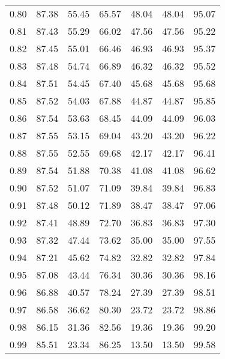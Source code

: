 \begin{tabular}{|c|c|c|c|c|c|c|}
      0.80 &     87.38 &     55.45 &      65.57 &   48.04 &      48.04 &         95.07 \\
      0.81 &     87.43 &     55.29 &      66.02 &   47.56 &      47.56 &         95.22 \\
      0.82 &     87.45 &     55.01 &      66.46 &   46.93 &      46.93 &         95.37 \\
      0.83 &     87.48 &     54.74 &      66.89 &   46.32 &      46.32 &         95.52 \\
      0.84 &     87.51 &     54.45 &      67.40 &   45.68 &      45.68 &         95.68 \\
      0.85 &     87.52 &     54.03 &      67.88 &   44.87 &      44.87 &         95.85 \\
      0.86 &     87.54 &     53.63 &      68.45 &   44.09 &      44.09 &         96.03 \\
      0.87 &     87.55 &     53.15 &      69.04 &   43.20 &      43.20 &         96.22 \\
      0.88 &     87.55 &     52.55 &      69.68 &   42.17 &      42.17 &         96.41 \\
      0.89 &     87.54 &     51.88 &      70.38 &   41.08 &      41.08 &         96.62 \\
      0.90 &     87.52 &     51.07 &      71.09 &   39.84 &      39.84 &         96.83 \\
      0.91 &     87.48 &     50.12 &      71.89 &   38.47 &      38.47 &         97.06 \\
      0.92 &     87.41 &     48.89 &      72.70 &   36.83 &      36.83 &         97.30 \\
      0.93 &     87.32 &     47.44 &      73.62 &   35.00 &      35.00 &         97.55 \\
      0.94 &     87.21 &     45.62 &      74.82 &   32.82 &      32.82 &         97.84 \\
      0.95 &     87.08 &     43.44 &      76.34 &   30.36 &      30.36 &         98.16 \\
      0.96 &     86.88 &     40.57 &      78.24 &   27.39 &      27.39 &         98.51 \\
      0.97 &     86.58 &     36.62 &      80.30 &   23.72 &      23.72 &         98.86 \\
      0.98 &     86.15 &     31.36 &      82.56 &   19.36 &      19.36 &         99.20 \\
      0.99 &     85.51 &     23.34 &      86.25 &   13.50 &      13.50 &         99.58 \\
\bottomrule
\end{tabular}

